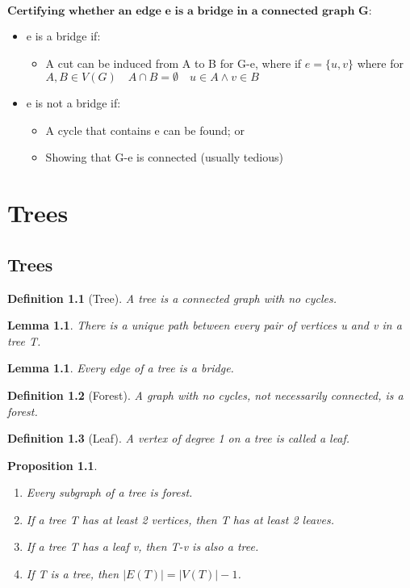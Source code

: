 \documentclass[11pt, oneside]{book}
\theoremstyle{break}
\newtheorem{lemma}[thm]{Lemma}
\newtheorem{propo}{Proposition}[section]
\newtheorem{defn}{Definition}[section]
\begin{document}
$\textbf{Certifying whether an edge e is a bridge in a connected graph G:}$

\begin{itemize}
	\item e is a bridge if:
	\begin{itemize}
		\item A cut can be induced from A to B for G-e, where if $e=\{u, v\}$ where for $A, B \in V(G) \quad A \cap B = \emptyset \quad u \in A \land v \in B$ 
	\end{itemize}
	\item e is not a bridge if:
	\begin{itemize}
		\item A cycle that contains e can be found; or
		\item Showing that G-e is connected (usually tedious)
	\end{itemize}
\end{itemize}



\chapter{Trees}


\section{Trees}

\begin{defn}[Tree]
	A tree is a connected graph with no cycles.
\end{defn}

\begin{lemma}
	There is a unique path between every pair of vertices u and v in a tree T.
\end{lemma}

\begin{lemma}
	Every edge of a tree is a bridge.
\end{lemma}

\begin{defn}[Forest]
	A graph with no cycles, not necessarily connected, is a forest.
\end{defn}

\begin{defn}[Leaf]
	A vertex of degree 1 on a tree is called a leaf.
\end{defn}

\begin{propo}
	\begin{enumerate}
		\item Every subgraph of a tree is forest.
		\item If a tree T has at least 2 vertices, then T has at least 2 leaves.
		\item If a tree T has a leaf v, then T-v is also a tree.
		\item If T is a tree, then $|E(T)| = |V(T)| - 1$.
	\end{enumerate}
\end{propo}
\end{document}
